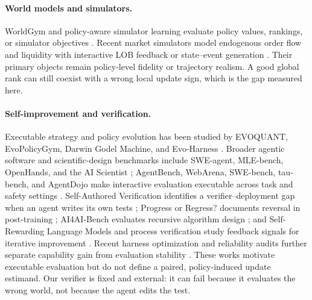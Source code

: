 \documentclass{article}
\begin{document}
\paragraph{World models and simulators.}
WorldGym and policy-aware simulator learning evaluate policy values, rankings,
or simulator objectives \cite{worldgym2025,policyaware2026,tdmpc22024}.
Recent market simulators model endogenous order flow and liquidity with
interactive LOB feedback or state--event generation
\cite{lobreality2026,m3market2026,tradefm2026}.  Their primary objects remain
policy-level fidelity or trajectory realism.  A good global rank can still
coexist with a wrong local update sign, which is the gap measured here.

\paragraph{Self-improvement and verification.}
Executable strategy and policy evolution has been studied by EVOQUANT,
EvoPolicyGym, Darwin Godel Machine, and Evo-Harness
\cite{evoquant2026,evopolicygym2026,dgm2025,evoharness2026}.  Broader
agentic software and scientific-design benchmarks include SWE-agent,
MLE-bench, OpenHands, and the AI Scientist
\cite{yang2024sweagent,chan2024mlebench,wang2024openhands,lu2024aiscientist};
AgentBench, WebArena, SWE-bench, tau-bench, and AgentDojo make interactive
evaluation executable across task and safety settings
\cite{agentbench2024,webarena2024,swebench2024,yao2024taubench,debenedetti2024agentdojo}.
Self-Authored
Verification identifies a verifier--deployment gap when an agent writes its
own tests \cite{selfauthored2026}; Progress or Regress? documents reversal in
post-training \cite{wu2024progress}; AI4AI-Bench evaluates recursive
algorithm design \cite{chi2026ai4ai}; and Self-Rewarding Language Models and
process verification study feedback signals for iterative improvement
\cite{yuan2024selfrewarding,lightman2023verify}.  Recent harness optimization
and reliability audits further separate capability gain from evaluation
stability \cite{sbco2026,fragility2026}.  These works motivate executable
evaluation but do not define a paired, policy-induced update estimand.  Our
verifier is fixed and external: it can fail because it evaluates the wrong
world, not because the agent edits the test.
\end{document}
